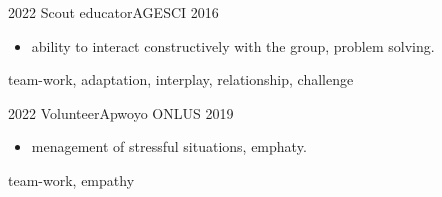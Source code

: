 %
%
%


\begin{scholarship}
 \experience
    {2022}   {Scout educator}{AGESCI}{}
    {2016} {
                      \begin{itemize}
                       \item ability to interact constructively with the group, problem solving.
                      \end{itemize}
                    }
                    {team-work, adaptation, interplay, relationship, challenge}
  \emptySeparator
 
 \experience
     {2022}   {Volunteer}{Apwoyo ONLUS}{}
    {2019} {
                      \begin{itemize}
                       \item menagement of stressful situations, emphaty.
                      \end{itemize}
                    }
                    {team-work, empathy}
  \emptySeparator
\end{scholarship}